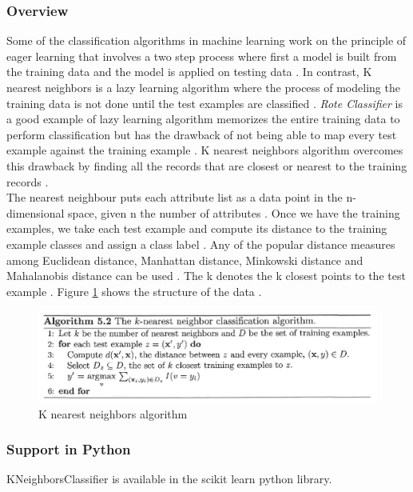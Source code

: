 \documentclass[sigconf]{acmart}
\begin{document}
\subsubsection{Overview} Some of the classification algorithms in machine learning work on the principle of eager learning that involves a two step process where first a model is built from the training data and the model is applied on testing data \cite{book-tan}. In contrast, K nearest neighbors is a lazy learning algorithm where the process of modeling the training data is not done until the test examples are classified \cite{book-tan}. {\em Rote Classifier} is a good example of lazy learning algorithm memorizes the entire training data to perform classification but has the drawback of not being able to map every test example against the training example \cite{book-tan}. K nearest neighbors algorithm overcomes this drawback by finding all the records that are closest or nearest to the training records \cite{book-tan}. \\

The nearest neighbour puts each attribute list as a data point in the n-dimensional space, given n the number of attributes \cite{book-tan}. Once we have the training examples, we take each test example and compute its distance to the training example classes and assign a class label \cite{book-tan}. Any of the popular distance measures among Euclidean distance, Manhattan distance, Minkowski distance and Mahalanobis distance can be used \cite{book-tan}. The k denotes the k closest points to the test example \cite{book-tan}. Figure \ref{fig:Fig1} shows the structure of the data \cite{book-tan}.

\begin{figure}
\includegraphics[width=1.0\textwidth]{images/fig1.png}
\caption{K nearest neighbors algorithm\cite{book-tan}}
\label{fig:Fig1}
\end{figure}

\subsubsection{Support in Python} 
KNeighborsClassifier is available in the scikit learn python library. 
\end{document}
